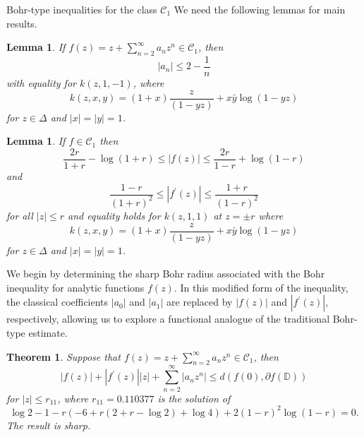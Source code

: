 \documentclass[12pt,a4paper,reqno]{amsart}
\theoremstyle{definition}
\theoremstyle{plain}
\newtheorem{theorem}[definition]{Theorem}
\newtheorem{lemma}[definition]{Lemma}
\numberwithin{equation}{section}
\begin{document}
\begin{section}{Bohr-type inequalities for the class $\mathcal{C}_1$}
\noindent
We need the following lemmas for main results.
\begin{lemma}\label{lm1}\cite{Sil1972}
If $f(z)= z + \sum_{n=2}^{\infty} a_n z^n \in \mathcal{C}_1$, then
\begin{equation} \label{coef1}
|a_n| \le 2- \frac{1}{n}
\end{equation}
with equality for $k(z,1,-1)$, where
\begin{equation*}
k(z,x,y)= (1+x) \frac{z}{(1-yz)} + x \bar{y} \log{(1-yz)}
\end{equation*}
for $z \in \Delta$ and $|x|=|y|=1$.
\end{lemma}
\begin{lemma}\label{lm2}{\cite{Sil1972}}
If $f \in \mathcal{C}_1$ then
\begin{equation} \label{growth1}
\frac{2r}{1+r} -\log(1+r) \le |f(z)| \le \frac{2r}{1-r} +\log(1-r)
\end{equation}
and
\begin{equation} \label{distortion1}
\frac{1-r}{(1+r)^2} \le |f^{'}(z)| \le \frac{1+r}{(1-r)^2}
\end{equation}
for all $|z| \le r$ and equality holds for $k(z,1,1)$ at $z=\pm r$  where
\begin{equation*}
k(z,x,y)= (1+x) \frac{z}{(1-yz)} + x \bar{y} \log{(1-yz)}
\end{equation*}
for $z \in \Delta$ and $|x|=|y|=1$.
\end{lemma}
\noindent
We begin by determining the sharp Bohr radius associated with the Bohr inequality for analytic functions $f(z)$. In this modified form of the inequality, the classical coefficients $|a_0|$ and $|a_1|$ are replaced by $|f(z)|$ and $|f^{'}(z)|$, respectively, allowing us to explore a functional analogue of the traditional Bohr-type estimate.
\begin{theorem}
Suppose that $f(z)=z + \sum_{n=2}^{\infty} a_n z^n \in \mathcal{C}_1$, then
\begin{equation}\label{2.1.1}
|f(z)| + |f^{'}(z)||z| + \sum_{n=2}^{\infty} |a_n z^n| \le d( f(0), \partial{f(\mathbb{D})})
\end{equation}
for $|z| \le r_{11}$, where $r_{11}=0.110377$ is the solution of
\begin{equation*}
    \log2-1-r (-6+r (2+r-\log2)+\log4)+2 (1-r)^2 \log(1-r) =0.
\end{equation*}
The result is sharp.
\end{theorem}

\end{section}
\end{document}
